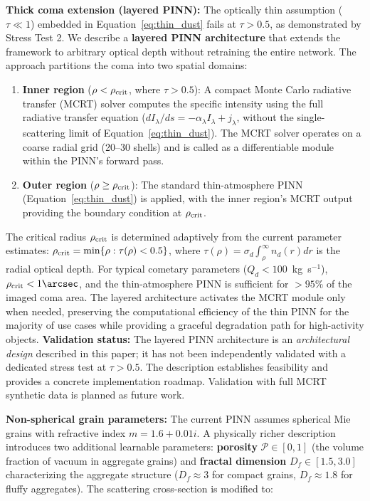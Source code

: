 \documentclass[preprint2]{aastex631}
\begin{document}
\textbf{Thick coma extension (layered PINN):} The optically thin assumption ($\tau \ll 1$) embedded in Equation~\ref{eq:thin_dust} fails at $\tau > 0.5$, as demonstrated by Stress Test 2. We describe a \textbf{layered PINN architecture} that extends the framework to arbitrary optical depth without retraining the entire network. The approach partitions the coma into two spatial domains:

\begin{enumerate}
    \item \textbf{Inner region} ($\rho < \rho_{\rm crit}$, where $\tau > 0.5$): A compact Monte Carlo radiative transfer (MCRT) solver computes the specific intensity using the full radiative transfer equation ($dI_\lambda/ds = -\alpha_\lambda I_\lambda + j_\lambda$, without the single-scattering limit of Equation~\ref{eq:thin_dust}). The MCRT solver operates on a coarse radial grid (20--30 shells) and is called as a differentiable module within the PINN's forward pass.
    \item \textbf{Outer region} ($\rho \geq \rho_{\rm crit}$): The standard thin-atmosphere PINN (Equation~\ref{eq:thin_dust}) is applied, with the inner region's MCRT output providing the boundary condition at $\rho_{\rm crit}$.
\end{enumerate}

The critical radius $\rho_{\rm crit}$ is determined adaptively from the current parameter estimates: $\rho_{\rm crit} = \min\{\rho : \tau(\rho) < 0.5\}$, where $\tau(\rho) = \sigma_d \int_{\rho}^{\infty} n_d(r) dr$ is the radial optical depth. For typical cometary parameters ($Q_d < 100$~kg~s$^{-1}$), $\rho_{\rm crit} < 1\arcsec$, and the thin-atmosphere PINN is sufficient for $>95\%$ of the imaged coma area. The layered architecture activates the MCRT module only when needed, preserving the computational efficiency of the thin PINN for the majority of use cases while providing a graceful degradation path for high-activity objects. \textbf{Validation status:} The layered PINN architecture is an \textit{architectural design} described in this paper; it has not been independently validated with a dedicated stress test at $\tau > 0.5$. The description establishes feasibility and provides a concrete implementation roadmap. Validation with full MCRT synthetic data is planned as future work.

\textbf{Non-spherical grain parameters:} The current PINN assumes spherical Mie grains with refractive index $m = 1.6 + 0.01i$. A physically richer description introduces two additional learnable parameters: \textbf{porosity} $\mathcal{P} \in [0, 1]$ (the volume fraction of vacuum in aggregate grains) and \textbf{fractal dimension} $D_f \in [1.5, 3.0]$ characterizing the aggregate structure ($D_f \approx 3$ for compact grains, $D_f \approx 1.8$ for fluffy aggregates). The scattering cross-section is modified to:
\end{document}
